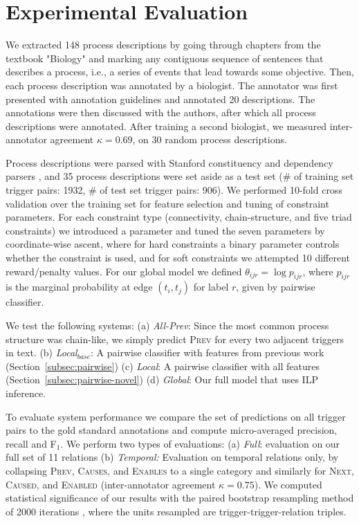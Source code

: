 \section{Experimental Evaluation} \label{subsec:setup}

We extracted 148 process descriptions by going through chapters from the textbook "Biology" and marking any contiguous sequence of sentences that describes a process, i.e., a series of events that lead towards some objective. Then, each process description was annotated by a biologist. The annotator was first presented with annotation guidelines and annotated 20 descriptions. The annotations were then discussed with the authors, after which all process descriptions were annotated. After training a second biologist, we measured inter-annotator agreement $\kappa=0.69$, on 30 random process descriptions. 

Process descriptions were parsed with Stanford constituency and dependency parsers \cite{Klein03,Marneffe06}, and 35 process descriptions were set aside as a test set (\# of training set trigger pairs: 1932, \# of test set trigger pairs: 906). We performed 10-fold cross validation over the training set for feature selection and tuning of constraint parameters. For each constraint type (connectivity, chain-structure, and five triad constraints) we introduced a parameter and tuned the seven parameters by coordinate-wise ascent, where for hard constraints a binary parameter controls whether the constraint is used, and for soft constraints we attempted 10 different reward/penalty values. For our global model we defined $\theta_{ijr}=\log p_{ijr}$, where $p_{ijr}$ is the marginal probability at edge $(t_i,t_j)$ for label $r$, given by pairwise classifier.


We test the following systems: (a) \emph{All-Prev}: Since the most common process structure was chain-like, we simply predict \textsc{Prev} for every two adjacent triggers in text. (b) \emph{Local$_{base}$}: A pairwise classifier with features from previous work (Section~\ref{subsec:pairwise}) (c) \emph{Local}: A pairwise classifier with all features (Section~\ref{subsec:pairwise-novel}) (d) \emph{Global}: Our full model that uses ILP inference.


To evaluate system performance we compare the set of predictions on all trigger pairs to the gold standard annotations and compute micro-averaged precision, recall and F$_1$. We perform two types of evaluations: (a) \emph{Full}: evaluation on our full set of 11 relations (b) \emph{Temporal:} Evaluation on temporal relations only, by collapsing \textsc{Prev}, \textsc{Causes}, and \textsc{Enables} to a single category and similarly for \textsc{Next}, \textsc{Caused}, and \textsc{Enabled} (inter-annotator agreement $\kappa=0.75$). We computed statistical significance of our results with the paired bootstrap resampling method of 2000 iterations \cite{efron1993}, where the units resampled are trigger-trigger-relation triples.

